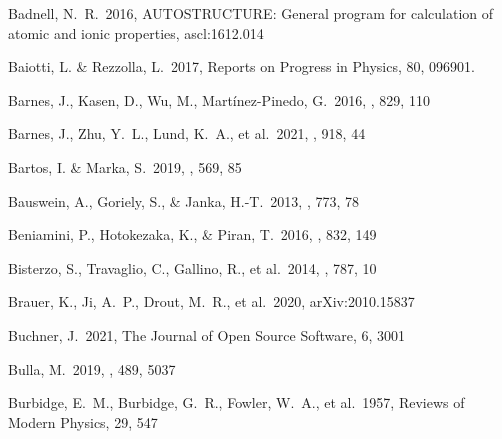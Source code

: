 \documentclass[twocolumn, twocolappendix]{aastex63}
\begin{document}
\begin{thebibliography}{}
 Badnell, N.~R.\ 2016, AUTOSTRUCTURE: General program for calculation of atomic and ionic properties, ascl:1612.014


 Baiotti, L. \& Rezzolla, L.\ 2017, Reports on Progress in Physics, 80, 096901.








 Barnes, J., Kasen, D., Wu, M., Mart\'{i}nez-Pinedo, G.\ 2016, \apj, 829, 110


 Barnes, J., Zhu, Y.~L., Lund, K.~A., et al.\ 2021, \apj, 918, 44




 Bartos, I. \& Marka, S.\ 2019, \nat, 569, 85


 Bauswein, A., Goriely, S., \& Janka, H.-T.\ 2013, \apj, 773, 78



 Beniamini, P., Hotokezaka, K., \& Piran, T.\ 2016, \apj, 832, 149



 Bisterzo, S., Travaglio, C., Gallino, R., et al.\ 2014, \apj, 787, 10


 Brauer, K., Ji, A.~P., Drout, M.~R., et al.\ 2020, arXiv:2010.15837


 Buchner, J.\ 2021, The Journal of Open Source Software, 6, 3001


 Bulla, M.\ 2019, \mnras, 489, 5037


 Burbidge, E.~M., Burbidge, G.~R., Fowler, W.~A., et al.\ 1957, Reviews of Modern Physics, 29, 547



\end{thebibliography}
\end{document}
